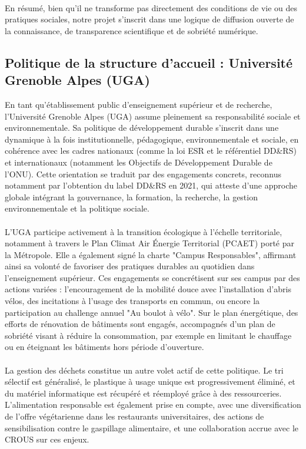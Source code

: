 \documentclass[12pt]{article}
\begin{document}
\\
En résumé, bien qu’il ne transforme pas directement des conditions de vie ou des pratiques sociales, notre projet s’inscrit dans une logique de diffusion ouverte de la connaissance, de transparence scientifique et de sobriété numérique. 

\subsection{Politique de la structure d'accueil : Université Grenoble Alpes (UGA)}
En tant qu’établissement public d’enseignement supérieur et de recherche, l’Université Grenoble Alpes (UGA) assume pleinement sa responsabilité sociale et environnementale. Sa politique de développement durable s’inscrit dans une dynamique à la fois institutionnelle, pédagogique, environnementale et sociale, en cohérence avec les cadres nationaux (comme la loi ESR et le référentiel DD\&RS) et internationaux (notamment les Objectifs de Développement Durable de l’ONU). Cette orientation se traduit par des engagements concrets, reconnus notamment par l’obtention du label DD\&RS en 2021, qui atteste d’une approche globale intégrant la gouvernance, la formation, la recherche, la gestion environnementale et la politique sociale.\\
\\
L’UGA participe activement à la transition écologique à l’échelle territoriale, notamment à travers le Plan Climat Air Énergie Territorial (PCAET) porté par la Métropole. Elle a également signé la charte "Campus Responsables", affirmant ainsi sa volonté de favoriser des pratiques durables au quotidien dans l’enseignement supérieur. Ces engagements se concrétisent sur ses campus par des actions variées : l’encouragement de la mobilité douce avec l’installation d’abris vélos, des incitations à l’usage des transports en commun, ou encore la participation au challenge annuel "Au boulot à vélo". Sur le plan énergétique, des efforts de rénovation de bâtiments sont engagés, accompagnés d’un plan de sobriété visant à réduire la consommation, par exemple en limitant le chauffage ou en éteignant les bâtiments hors période d’ouverture.\\
\\
La gestion des déchets constitue un autre volet actif de cette politique. Le tri sélectif est généralisé, le plastique à usage unique est progressivement éliminé, et du matériel informatique est récupéré et réemployé grâce à des ressourceries. L’alimentation responsable est également prise en compte, avec une diversification de l’offre végétarienne dans les restaurants universitaires, des actions de sensibilisation contre le gaspillage alimentaire, et une collaboration accrue avec le CROUS sur ces enjeux.\\
\end{document}
